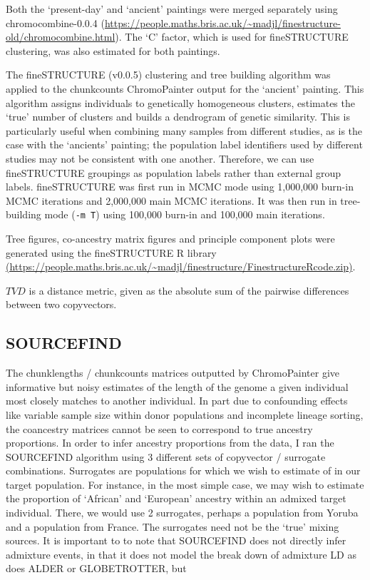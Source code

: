 Both the `present-day' and `ancient' paintings were merged separately using chromocombine-0.0.4 (\url{https://people.maths.bris.ac.uk/~madjl/finestructure-old/chromocombine.html}). The `C' factor, which is used for fineSTRUCTURE clustering, was also estimated for both paintings. 

The fineSTRUCTURE (v0.0.5)\cite{Lawson2012} clustering and tree building algorithm was applied to the chunkcounts ChromoPainter output for the `ancient' painting. This algorithm assigns individuals to genetically homogeneous clusters, estimates the `true' number of clusters and builds a dendrogram of genetic similarity. This is particularly useful when combining many samples from different studies, as is the case with the `ancients' painting; the population label identifiers used by different studies may not be consistent with one another. Therefore, we can use fineSTRUCTURE groupings as population labels rather than external group labels. fineSTRUCTURE was first run in MCMC mode using 1,000,000 burn-in MCMC iterations and 2,000,000 main MCMC iterations. It was then run in tree-building mode (\texttt{-m T}) using 100,000 burn-in and 100,000 main iterations. 

Tree figures, co-ancestry matrix figures and principle component plots were generated using the fineSTRUCTURE R library \url{(https://people.maths.bris.ac.uk/~madjl/finestructure/FinestructureRcode.zip)}.

$TVD$ is a distance metric, given as the absolute sum of the pairwise differences between two copyvectors.

\subsection{SOURCEFIND}

The chunklengths / chunkcounts matrices outputted by ChromoPainter give informative but noisy estimates of the length of the genome a given individual most closely matches to another individual. In part due to confounding effects like variable sample size within donor populations and incomplete lineage sorting, the coancestry matrices cannot be seen to correspond to true ancestry proportions. In order to infer ancestry proportions from the data, I ran the SOURCEFIND algorithm \cite{Chacon-Duque2018} using 3 different sets of copyvector / surrogate combinations. Surrogates are populations for which we wish to estimate of in our target population. For instance, in the most simple case, we may wish to estimate the proportion of `African' and `European' ancestry within an admixed target individual. There, we would use 2 surrogates, perhaps a population from Yoruba and a population from France. The surrogates need not be the `true' mixing sources. It is important to to note that SOURCEFIND does not directly infer admixture events, in that it does not model the break down of admixture LD as does ALDER or GLOBETROTTER, but 

